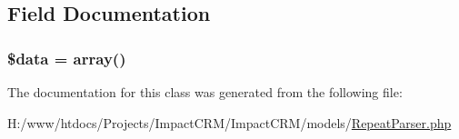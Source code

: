 \subsection{Field Documentation}
\hypertarget{classRepeat__Parser_a6efc15b5a2314dd4b5aaa556a375c6d6}{
\subsubsection[{\$data}]{\setlength{\rightskip}{0pt plus 5cm}\$data = array()}}
\label{classRepeat__Parser_a6efc15b5a2314dd4b5aaa556a375c6d6}


The documentation for this class was generated from the following file:\begin{DoxyCompactItemize}
\item 
H:/www/htdocs/Projects/ImpactCRM/ImpactCRM/models/\hyperlink{RepeatParser_8php}{RepeatParser.php}\end{DoxyCompactItemize}
